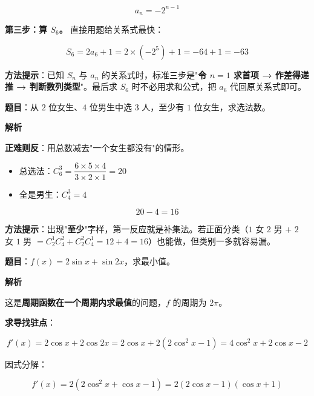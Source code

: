 \[a_n=-2^{n-1}\]

\textbf{第三步：算 $S_6$。} 直接用题给关系式最快：

\[S_6=2a_6+1=2\times\left(-2^{5}\right)+1=-64+1=-63\]


\begin{gktip}
\textbf{方法提示}：已知 $S_n$ 与 $a_n$ 的关系式时，标准三步是"\textbf{令 $n=1$ 求首项 → 作差得递推 → 判断数列类型}"。最后求 $S_6$ 时不必用求和公式，把 $a_6$ 代回原关系式即可。
\end{gktip}

\par\medskip


\textbf{题目}：从 $2$ 位女生、$4$ 位男生中选 $3$ 人，至少有 $1$ 位女生，求选法数。

\textbf{解析}

\textbf{正难则反}：用总数减去"一个女生都没有"的情形。

\begin{itemize}
\item 总选法：$C_6^{3}=\dfrac{6\times5\times4}{3\times2\times1}=20$
\item 全是男生：$C_4^{3}=4$
\end{itemize}

\[20-4=16\]


\begin{gktip}
\textbf{方法提示}：出现"\textbf{至少}"字样，第一反应就是补集法。若正面分类（$1$ 女 $2$ 男 $+$ $2$ 女 $1$ 男 $=C_2^{1}C_4^{2}+C_2^{2}C_4^{1}=12+4=16$）也能做，但类别一多就容易漏。
\end{gktip}

\par\medskip


\textbf{题目}：$f(x)=2\sin x+\sin2x$，求最小值。

\textbf{解析}

这是\textbf{周期函数在一个周期内求最值}的问题，$f$ 的周期为 $2\pi$。

\textbf{求导找驻点}：

\[f'(x)=2\cos x+2\cos2x=2\cos x+2\left(2\cos^{2}x-1\right)=4\cos^{2}x+2\cos x-2\]

因式分解：

\[f'(x)=2\left(2\cos^{2}x+\cos x-1\right)=2(2\cos x-1)(\cos x+1)\]

